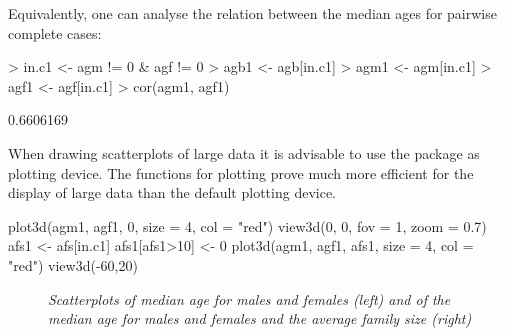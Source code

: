 \documentclass[12pt,a4paper]{article}
\begin{document}
Equivalently, one can analyse the relation between the median ages for pairwise complete cases:

\begin{Schunk}
\begin{Sinput}
> in.c1 <- agm != 0 & agf != 0
> agb1 <- agb[in.c1]
> agm1 <- agm[in.c1]
> agf1 <- agf[in.c1]
> cor(agm1, agf1)
\end{Sinput}
\begin{Soutput}
[1] 0.6606169
\end{Soutput}
\end{Schunk}

When drawing scatterplots of large data it is advisable to use the  package \citep{rgl1,rgl2} as plotting device. 
The  functions for plotting prove much more efficient for the display of large data than the default \R{} plotting device.


\begin{Sinput}
plot3d(agm1, agf1, 0, size = 4, col = "red")
view3d(0, 0, fov = 1, zoom = 0.7)
afs1 <- afs[in.c1]
afs1[afs1>10] <- 0
plot3d(agm1, agf1, afs1, size = 4, col = "red")
view3d(-60,20)
\end{Sinput}

\begin{figure}[h]
  \begin{center}
    \caption{\textsl{Scatterplots of median age for males and females (left) and of the median age for males and females and the average family size (right)}}
    \label{scatter}
  \end{center}
\end{figure}
\end{document}
